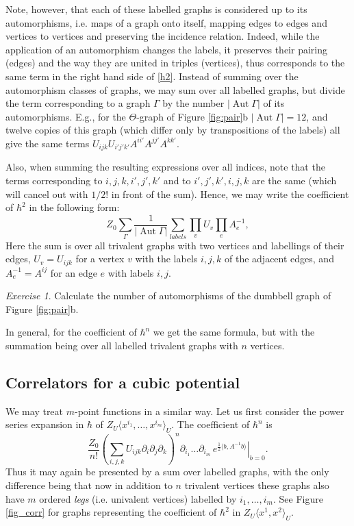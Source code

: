 \documentclass[10pt]{amsart}
\theoremstyle{definition}
\theoremstyle{remark}
\newtheorem{exs}[thm]{Exercise}
\newcommand{\dd}{\partial}
\def\<{\langle}
\def\>{\rangle}
\newcommand{\h}{\hbar}
\newcommand{\GG}{\Gamma}
\newcommand{\GT}{\Theta}
\newcommand{\Aut}{\operatorname{Aut}}
\begin{document}
Note, however, that each of these labelled graphs is considered
up to its automorphisms, i.e. maps of a graph onto itself, mapping
edges to edges and vertices to vertices and preserving the incidence
relation.
Indeed, while the application of an automorphism changes the labels,
it preserves their pairing (edges) and the way they are united in
triples (vertices), thus corresponds to the same term in the right
hand side of \eqref{h2}.
Instead of summing over the automorphism classes of graphs, we may
sum over all labelled graphs, but divide the term corresponding to
a graph $\GG$ by the number $|\Aut \GG |$ of its automorphisms.
E.g., for the $\GT$-graph of Figure \ref{fig:pair}b $|\Aut \GG |=12$,
and twelve copies of this graph (which differ only by transpositions
of the labels) all give the same terms
$U_{ijk}U_{i'j'k'}A^{ii'}A^{jj'}A^{kk'}$.

Also, when summing the resulting expressions over all indices,
note that the terms corresponding to $i,j,k,i',j',k'$ and to
$i',j',k',i,j,k$ are the same (which will cancel out with $1/2!$
in front of the sum). Hence, we may write the coefficient of
$\h^2$ in the following form:
$$Z_0\sum_\GG\frac1{|\Aut \GG|}\sum_{labels}
\prod_{v} U_v\prod_{e} A^{-1}_e,$$ Here the sum is over all
trivalent graphs with two vertices and labellings of their edges,
$U_v=U_{ijk}$ for a vertex $v$ with the labels $i,j,k$ of the
adjacent edges, and $A^{-1}_e=A^{ij}$ for an edge $e$ with labels
$i,j$.

\begin{exs}
Calculate the number of automorphisms of the dumbbell graph of
Figure \ref{fig:pair}b.
\end{exs}

In general, for the coefficient of $\h^n$ we get the same formula,
but with the summation being over all labelled trivalent graphs
with $n$ vertices.

\subsection{Correlators for a cubic potential}
We may treat $m$-point functions in a similar way. Let us first
consider the power series expansion in $\h$ of
$Z_U\<x^{i_1},\dots,x^{i_m}\>_U$. The coefficient of $\h^n$ is
$$
     \frac{Z_0}{n!}\left(\sum_{i,j,k} U_{ijk}\dd_i\dd_j\dd_k\right)^n
     \dd_{i_1}\dots\dd_{i_m}\,
       \left.  e^{\frac12\<b,A^{-1}b\>}\right|_{b=0}.
$$
Thus it may again be presented by a sum over labelled graphs, with
the only difference being that now in addition to $n$ trivalent
vertices these graphs also have $m$ ordered {\em legs} (i.e.
univalent vertices) labelled by $i_1,\dots,i_m$. See Figure
\ref{fig_corr} for graphs representing the coefficient of $\h^2$
in $Z_U\<x^1,x^2\>_U$.
\end{document}
